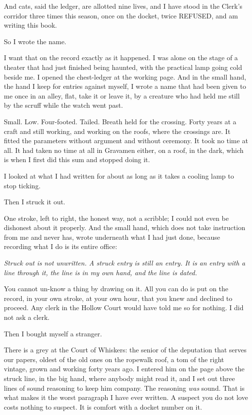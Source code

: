 And cats, said the ledger, are allotted nine lives, and I have stood in the Clerk's corridor three times this season, once on the docket, twice REFUSED, and am writing this book.

So I wrote the name.

I want that on the record exactly as it happened. I was alone on the stage of a theater that had just finished being haunted, with the practical lamp going cold beside me. I opened the chest-ledger at the working page. And in the small hand, the hand I keep for entries against myself, I wrote a name that had been given to me once in an alley, flat, take it or leave it, by a creature who had held me still by the scruff while the watch went past.

Small. Low. Four-footed. Tailed. Breath held for the crossing. Forty years at a craft and still working, and working on the roofs, where the crossings are. It fitted the parameters without argument and without ceremony. It took no time at all. It had taken no time at all in Gravamen either, on a roof, in the dark, which is when I first did this sum and stopped doing it.

I looked at what I had written for about as long as it takes a cooling lamp to stop ticking.

Then I struck it out.

One stroke, left to right, the honest way, not a scribble; I could not even be dishonest about it properly. And the small hand, which does not take instruction from me and never has, wrote underneath what I had just done, because recording what I do is its entire office:

\emph{Struck out is not unwritten. A struck entry is still an entry. It is an entry with a line through it, the line is in my own hand, and the line is dated.}

You cannot un-know a thing by drawing on it. All you can do is put on the record, in your own stroke, at your own hour, that you knew and declined to proceed. Any clerk in the Hollow Court would have told me so for nothing. I did not ask a clerk.

Then I bought myself a stranger.

There is a grey at the Court of Whiskers: the senior of the deputation that serves our papers, oldest of the old ones on the ropewalk roof, a tom of the right vintage, grown and working forty years ago. I entered him on the page above the struck line, in the big hand, where anybody might read it, and I set out three lines of sound reasoning to keep him company. The reasoning \emph{was} sound. That is what makes it the worst paragraph I have ever written. A suspect you do not love costs nothing to suspect. It is comfort with a docket number on it.

